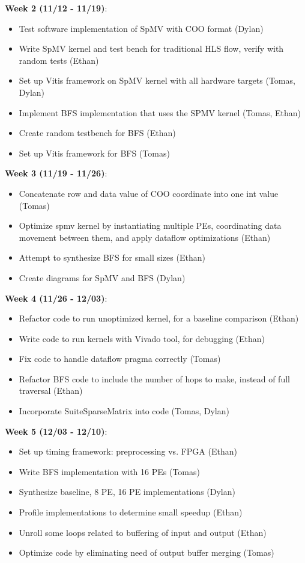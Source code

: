 \documentclass[10pt]{article}
\begin{document}
\noindent \textbf{Week 2 (11/12 - 11/19)}:
\begin{itemize}
  \item Test software implementation of SpMV with COO format (Dylan)
  \item Write SpMV kernel and test bench for traditional HLS flow, verify with random tests (Ethan)
  \item Set up Vitis framework on SpMV kernel with all hardware targets (Tomas, Dylan)
  \item Implement BFS implementation that uses the SPMV kernel (Tomas, Ethan)
  \item Create random testbench for BFS (Ethan)
  \item Set up Vitis framework for BFS (Tomas)
\end{itemize}

\noindent \textbf{Week 3 (11/19 - 11/26)}:
\begin{itemize}
  \item Concatenate row and data value of COO coordinate into one int value (Tomas)
  \item Optimize spmv kernel by instantiating multiple PEs, coordinating data movement between them, and apply dataflow optimizations (Ethan)
  \item Attempt to synthesize BFS for small sizes (Ethan)
  \item Create diagrams for SpMV and BFS (Dylan)
\end{itemize}

\noindent \textbf{Week 4 (11/26 - 12/03)}:
\begin{itemize}
  \item Refactor code to run unoptimized kernel, for a baseline comparison (Ethan)
  \item Write code to run kernels with Vivado tool, for debugging (Ethan)
  \item Fix code to handle dataflow pragma correctly (Tomas)
  \item Refactor BFS code to include the number of hops to make, instead of full traversal (Ethan)
  \item Incorporate SuiteSparseMatrix into code (Tomas, Dylan)
\end{itemize}

\noindent \textbf{Week 5 (12/03 - 12/10)}:
\begin{itemize}
  \item Set up timing framework: preprocessing vs. FPGA (Ethan)
  \item Write BFS implementation with 16 PEs (Tomas)
  \item Synthesize baseline, 8 PE, 16 PE implementations (Dylan)
  \item Profile implementations to determine small speedup (Ethan)
  \item Unroll some loops related to buffering of input and output (Ethan)
  \item Optimize code by eliminating need of output buffer merging (Tomas)
\end{itemize}
\end{document}
